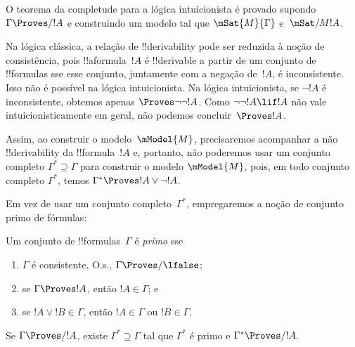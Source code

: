 \documentclass[../../../include/open-logic-section]{subfiles}
\begin{document}


O teorema da completude para a lógica intuicionista é provado supondo
$\Gamma \Proves/ !A$ e construindo um modelo tal que
$\mSat{M}{\Gamma}$ e~$\mSat/{M}{!A}$.

Na lógica clássica, a relação de !!{derivability} pode ser reduzida à
noção de consistência, pois !!a{formula}~$!A$ é !!{derivable} a partir
de um conjunto de !!{formula}s sse esse conjunto, juntamente com a
negação de~$!A$, é inconsistente. Isso não é possível na lógica
intuicionista. Na lógica intuicionista, se $\lnot!A$ é inconsistente,
obtemos apenas $\Proves \lnot\lnot !A$. Como
$\lnot\lnot!A \lif !A$ não vale intuicionisticamente em geral, não
podemos concluir~$\Proves !A$.

Assim, ao construir o modelo~$\mModel{M}$, precisaremos acompanhar a
não !!{derivability} da !!{formula}~$!A$ e, portanto, não poderemos
usar um conjunto completo $\Gamma^* \supseteq \Gamma$ para construir o
modelo $\mModel{M}$, pois, em todo conjunto completo $\Gamma^*$, temos
$\Gamma^* \Proves !A \lor \lnot !A$.

Em vez de usar um conjunto completo~$\Gamma^*$, empregaremos a noção
de conjunto primo de fórmulas:

\begin{defn}
  Um conjunto de !!{formula}s~$\Gamma$ é \emph{primo} sse
  \begin{enumerate}
  \item{} $\Gamma$ é consistente, O.s.\@,
    $\Gamma \Proves/ \lfalse$;
  \item{} se $\Gamma \Proves !A$, então
    $!A \in \Gamma$; e
  \item{} se $!A \lor !B \in \Gamma$, então
    $!A \in \Gamma$ ou $!B \in \Gamma$.
  \end{enumerate}
\end{defn}

\begin{lem}
   Se $\Gamma \Proves/ !A$, existe
  $\Gamma^* \supseteq \Gamma$ tal que $\Gamma^*$ é primo e
  $\Gamma^* \Proves/ !A$.
\end{lem}
\end{document}

